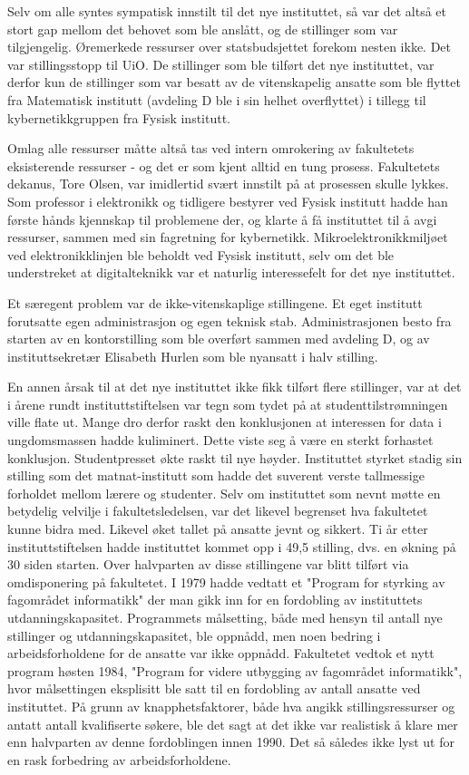 \documentclass[../main.tex]{subfiles}
\begin{document}
Selv om alle syntes sympatisk innstilt til det nye instituttet, så var det altså et stort gap mellom det behovet som ble anslått, og de stillinger som var tilgjengelig. Øremerkede ressurser over statsbudsjettet forekom nesten ikke. Det var stillingsstopp til UiO. De stillinger som ble tilført det nye instituttet, var derfor kun de stillinger som var besatt av de vitenskapelig ansatte som ble flyttet fra Matematisk institutt (avdeling D ble i sin helhet overflyttet) i tillegg til kybernetikkgruppen fra Fysisk institutt.

Omlag alle ressurser måtte altså tas ved intern omrokering av fakultetets eksisterende ressurser - og det er som kjent alltid en tung prosess. Fakultetets dekanus, Tore Olsen, var imidlertid svært innstilt på at prosessen skulle lykkes. Som professor i elektronikk og tidligere bestyrer ved Fysisk institutt hadde han første hånds kjennskap til problemene der, og klarte å få instituttet til å avgi ressurser, sammen med sin fagretning for kybernetikk. Mikroelektronikkmiljøet ved elektronikklinjen ble beholdt ved Fysisk institutt, selv om det ble understreket at digitalteknikk var et naturlig interessefelt for det nye instituttet.

Et særegent problem var de ikke-vitenskaplige stillingene. Et eget institutt forutsatte egen administrasjon og egen teknisk stab. Administrasjonen besto fra starten av en kontorstilling som ble overført sammen med avdeling D, og av instituttsekretær Elisabeth Hurlen som ble nyansatt i halv stilling.

En annen årsak til at det nye instituttet ikke fikk tilført flere stillinger, var at det i årene rundt instituttstiftelsen var tegn som tydet på at studenttilstrømningen ville flate ut. Mange dro derfor raskt den konklusjonen at interessen for data i ungdomsmassen hadde kuliminert. Dette viste seg å være en sterkt forhastet konklusjon. Studentpresset økte raskt til nye høyder. Instituttet styrket stadig sin stilling som det matnat-institutt som hadde det suverent verste tallmessige forholdet mellom lærere og studenter. Selv om instituttet som nevnt møtte en betydelig velvilje i fakultetsledelsen, var det likevel begrenset hva fakultetet kunne bidra med. Likevel øket tallet på ansatte jevnt og sikkert. Ti år etter instituttstiftelsen hadde instituttet kommet opp i 49,5 stilling, dvs. en økning på 30 siden starten. Over halvparten av disse stillingene var blitt tilført via omdisponering på fakultetet. I 1979 hadde vedtatt et "Program for styrking av fagområdet informatikk" der man gikk inn for en fordobling av instituttets utdanningskapasitet. Programmets målsetting, både med hensyn til antall nye stillinger og utdanningskapasitet, ble oppnådd, men noen bedring i arbeidsforholdene for de ansatte var ikke oppnådd. Fakultetet vedtok et nytt program høsten 1984, "Program for videre utbygging av fagområdet informatikk", hvor målsettingen eksplisitt ble satt til en fordobling av antall ansatte ved instituttet. På grunn av knapphetsfaktorer, både hva angikk stillingsressurser og antatt antall kvalifiserte søkere, ble det sagt at det ikke var realistisk å klare mer enn halvparten av denne fordoblingen innen 1990. Det så således ikke lyst ut for en rask forbedring av arbeidsforholdene.
\end{document}
